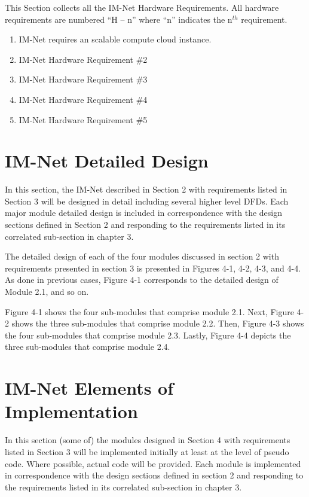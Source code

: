 \documentclass[letterpaper]{article}
\begin{document}
This Section collects all the IM-Net Hardware Requirements. All hardware requirements are numbered ``H -- n'' where ``n'' indicates the n${}^{th}$ requirement.

\begin{enumerate}
\item  IM-Net requires an scalable compute cloud instance.

\item  IM-Net Hardware Requirement \#2

\item  IM-Net Hardware Requirement \#3

\item  IM-Net Hardware Requirement \#4

\item  IM-Net Hardware Requirement \#5
\end{enumerate}

\eject

\section{\textcolor{section}{IM-Net Detailed Design}}

In this section, the IM-Net described in Section 2 with requirements listed in Section 3 will be designed in detail including several higher level DFDs. Each major module detailed design is included in correspondence with the design sections defined in Section 2 and responding to the requirements listed in its correlated sub-section in chapter 3.

The detailed design of each of the four modules discussed in section 2 with requirements presented in section 3 is presented in Figures 4-1, 4-2, 4-3, and 4-4. As done in previous cases, Figure 4-1 corresponds to the detailed design of Module 2.1, and so on.

Figure 4-1 shows the four sub-modules that comprise module 2.1. Next, Figure 4-2 shows the three sub-modules that comprise module 2.2. Then, Figure 4-3 shows the four sub-modules that comprise module 2.3. Lastly, Figure 4-4 depicts the three sub-modules that comprise module 2.4.

\eject 

 
\section{\textcolor{section}{IM-Net Elements of Implementation}}

In this section (some of) the modules designed in Section 4 with requirements listed in Section 3 will be implemented initially at least at the level of pseudo code. Where possible, actual code will be provided. Each module is implemented in correspondence with the design sections defined in section 2 and responding to the requirements listed in its correlated sub-section in chapter 3.
\end{document}
